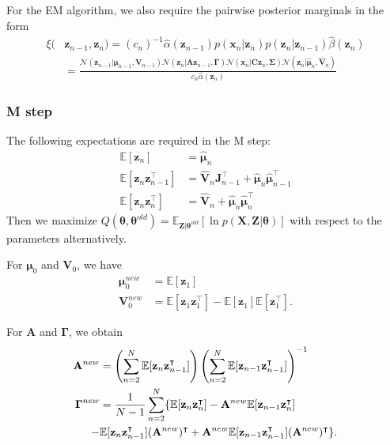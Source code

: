 \documentclass[a4paper]{book}
\renewcommand{\bf}{\mathbf}
\renewcommand{\cal}{\mathcal}
\newcommand{\bb}{\mathbb}
\newcommand{\bs}{\boldsymbol}
\begin{document}
For the EM algorithm, we also require the pairwise posterior marginals in the form
\begin{align}
	\xi(&\bf{z}_{n-1},\bf{z}_n) = (c_n)^{-1}\hat{\alpha}(\bf{z}_{n-1})p(\bf{x}_n|\bf{z}_n)p(\bf{z}_n|\bf{z}_{n-1})\hat{\beta}(\bf{z}_n) \\
	&=\frac{\cal{N}(\bf{z}_{n-1}|\bs{\mu}_{n-1},\bf{V}_{n-1})\cal{N}(\bf{z}_n|\bf{Az}_{n-1},\bs{\Gamma})\cal{N}(\bf{x}_n|\bf{Cz}_n,\bs{\Sigma})\cal{N}(\bf{z}_n|\hat{\bs{\mu}}_n,\hat{\bf{V}}_n)}{c_n\hat{\alpha}(\bf{z}_n)}
\end{align}
\subsubsection{M step}
The following expectations are required in the M step:
\begin{align}
	\bb{E}[\bf{z}_n] &= \hat{\bs{\mu}}_n \\
	\bb{E}[\bf{z}_n\bf{z}_{n-1}^{\intercal}] &= \hat{\bf{V}}_n \bf{J}_{n-1}^{\intercal} +\hat{\bs{\mu}}_n\hat{\bs{\mu}}_{n-1}^{\intercal}\\
	\bb{E}[\bf{z}_n\bf{z}_n^{\intercal}] &= \hat{\bf{V}}_n + \hat{\bs{\mu}}_n \hat{\bs{\mu}}_n^{\intercal}
\end{align}
Then we maximize $Q(\bs{\theta},\bs{\theta}^{old}) = \bb{E}_{\bf{Z}|\bs{\theta}^{old}}[\ln p(\bf{X,Z}|\bs{\theta})]$ with respect to the parameters alternatively.

For $\bs{\mu}_0$ and $\bf{V}_0$, we have
\begin{align}
	\bs{\mu}_0^{new} &= \bb{E}[\bf{z}_1] \\
	\bf{V}_0^{new} &= \bb{E}[\bf{z}_1\bf{z}_1^{\intercal}] - \bb{E}[\bf{z}_1]\bb{E}[\bf{z}_1^{\intercal}].
\end{align}

For $\bf{A}$ and $\bs{\Gamma}$, we obtain
\begin{align}
	\bf{A}^{new} &= \left(\sum_{n=2}^N \bb{E}[\bf{z}_n \bf{z}_{n-1}^{\intercal}]\right)\left( \sum_{n=2}^N \bb{E}[\bf{z}_{n-1}\bf{z}_{n-1}^{\intercal}] \right)^{-1} \\
	\bs{\Gamma}^{new} &= \frac{1}{N-1} \sum_{n=2}^N \{ \bb{E}[\bf{z}_n\bf{z}_n^{\intercal}]-\bf{A}^{new}\bb{E}[\bf{z}_{n-1}\bf{z}_n^{\intercal}] \notag\\
	-&\bb{E}[\bf{z}_n\bf{z}_{n-1}^{\intercal}](\bf{A}^{new})^{\intercal} + \bf{A}^{new} \bb{E}[\bf{z}_{n-1}\bf{z}_{n-1}^{\intercal}] (\bf{A}^{new})^{\intercal}\}.
\end{align}
\end{document}
